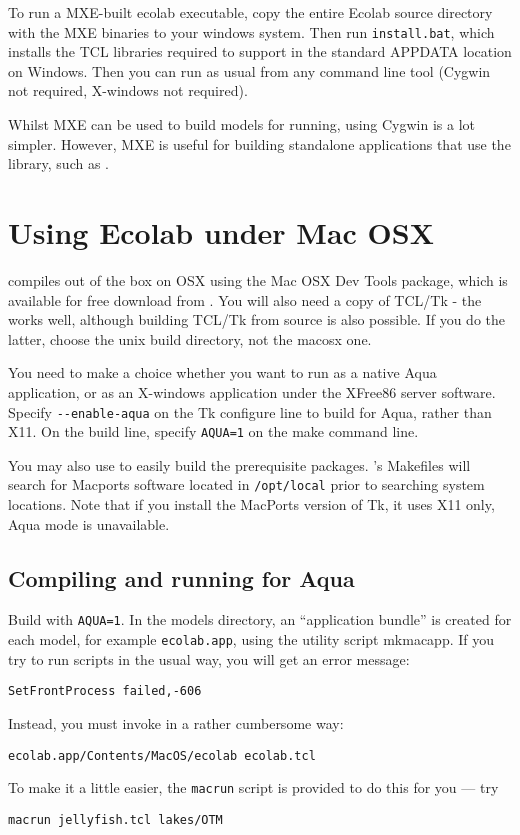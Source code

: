 To run a MXE-built ecolab executable, copy the entire Ecolab source
directory with the MXE binaries to your windows system. Then run
\verb+install.bat+, which installs the TCL libraries required to
support \EcoLab{} in the standard APPDATA location on Windows. Then
you can run \EcoLab{} as usual from any command line tool (Cygwin not
required, X-windows not required).

Whilst MXE can be used to build \EcoLab{} models for running, using
Cygwin is a lot simpler. However, MXE is useful for building
standalone applications that use the \EcoLab{} library, such as
.


\section{Using Ecolab under Mac OSX}

\EcoLab{} compiles out of the box on OSX using the Mac OSX
Dev Tools package, which is available for free download from
. You will also need a
copy of TCL/Tk - the
works well, although building TCL/Tk from source is also possible. If
you do the latter, choose the unix build directory, not the macosx
one. 

You need to make a choice whether you want to run \EcoLab{} as a
native Aqua application, or as an X-windows application under the
XFree86 server software. Specify
\verb+--enable-aqua+ on the Tk configure line to build for Aqua,
rather than X11. On the \EcoLab build line, specify \verb+AQUA=1+ on
the make command line.

You may also use
 to easily
build the prerequisite packages. \EcoLab{}'s Makefiles will search for
Macports software located in \verb+/opt/local+ prior to searching
system locations. Note that if you install the MacPorts version of Tk,
it uses X11 only, Aqua mode is unavailable.

\subsection{Compiling and running \protect\EcoLab{} for Aqua}

Build \EcoLab{} with \verb+AQUA=1+. In the models directory, an
``application bundle'' is created for each model, for example
\verb+ecolab.app+, using the utility script mkmacapp.
If you try to run \EcoLab{} scripts in the usual way, you will get an
error message:
\begin{verbatim}
SetFrontProcess failed,-606
\end{verbatim}
Instead, you must invoke \EcoLab{} in a rather cumbersome way:
\begin{verbatim}
ecolab.app/Contents/MacOS/ecolab ecolab.tcl
\end{verbatim}
To make it a little easier, the \verb+macrun+ script is
provided to do this for you --- try
\begin{verbatim}
macrun jellyfish.tcl lakes/OTM
\end{verbatim}

